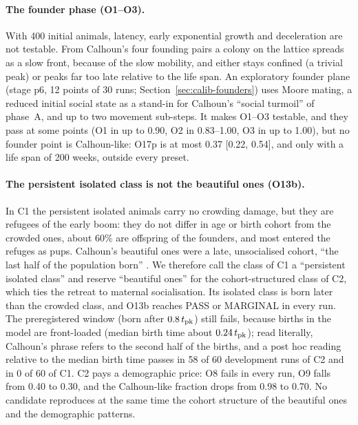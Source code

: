\paragraph{The founder phase (O1--O3).}
With 400 initial animals, latency, early exponential growth and deceleration are not testable. From Calhoun's four
founding pairs a colony on the lattice spreads as a slow front, because of the slow mobility, and either stays
confined (a trivial peak) or peaks far too late relative to the life span. An exploratory founder plane (stage p6, 12
points of 30 runs; Section~\ref{sec:calib-founders}) uses Moore mating, a reduced initial social state as a stand-in
for Calhoun's ``social turmoil'' of phase~A, and up to two movement sub-steps. It makes O1--O3 testable, and they pass
at some points (O1 in up to 0.90, O2 in 0.83--1.00, O3 in up to 1.00), but no founder point is Calhoun-like: O17p is
at most 0.37 [0.22, 0.54], and only with a life span of 200 weeks, outside every preset.

\paragraph{The persistent isolated class is not the beautiful ones (O13b).}
In \textsf{C1} the persistent isolated animals carry no crowding damage, but they are refugees of the early boom:
they do not differ in age or birth cohort from the crowded ones, about 60\% are offspring of the founders, and most
entered the refuges as pups. Calhoun's beautiful ones were a late, unsocialised cohort, ``the last half of the
population born'' \cite{Calhoun1973}. We therefore call the class of \textsf{C1} a ``persistent isolated class'' and
reserve ``beautiful ones'' for the cohort-structured class of \textsf{C2}, which ties the retreat to maternal
socialisation. Its isolated class is born later than the crowded class, and O13b reaches PASS or MARGINAL in every
run. The preregistered window (born after $0.8\,t_{\rm pk}$) still fails, because births in the model are
front-loaded (median birth time about $0.24\,t_{\rm pk}$); read literally, Calhoun's phrase refers to the second half
of the births, and a post hoc reading relative to the median birth time passes in 58 of 60 development runs of
\textsf{C2} and in 0 of 60 of \textsf{C1}. \textsf{C2} pays a demographic price: O8 fails in every run, O9 falls from
0.40 to 0.30, and the Calhoun-like fraction drops from 0.98 to 0.70. No candidate reproduces at the same time the
cohort structure of the beautiful ones and the demographic patterns.

